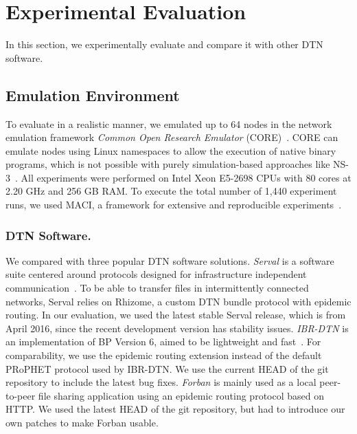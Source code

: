 \section{Experimental Evaluation}
\label{sec:evaluation}

In this section, we experimentally evaluate \dtn and compare it with other DTN software.

\subsection{Emulation Environment}
To evaluate \dtn in a realistic manner, we emulated up to 64 nodes in the network emulation framework \emph{Common Open Research Emulator} (CORE)~\cite{ahrenholz2010comparison}.
CORE can emulate nodes using Linux namespaces to allow the execution of native binary programs, which is not possible with purely simulation-based approaches like NS-3~\cite{riley2010ns,schwerdel2011tomato}.
All experiments were performed on Intel Xeon E5-2698 CPUs with 80 cores at 2.20 GHz and 256 GB RAM.
To execute the total number of 1,440 experiment runs, we used MACI, a framework for extensive and reproducible experiments~\cite{froemmgen2018maci}.

\subsubsection{DTN Software.}
We compared \dtn with three popular DTN software solutions.
\textit{Serval} is a software suite centered around protocols designed for infra\-structure independent communication~\cite{gardner2011serval}.
To be able to transfer files in intermittently connected networks, Serval relies on Rhizome, a custom DTN bundle protocol with epidemic routing.
In our evaluation, we used the latest stable Serval release, which is from April 2016, since the recent development version has stability issues.
\textit{IBR-DTN} is an implementation of BP Version 6, aimed to be lightweight and fast~\cite{doering2008ibr}.
For comparability, we use the epidemic routing extension instead of the default PRoPHET protocol used by IBR-DTN.
We use the current HEAD of the git repository to include the latest bug fixes.
\textit{Forban} is mainly used as a local peer-to-peer file sharing application using an epidemic routing protocol based on HTTP.
We used the latest HEAD of the git repository, but had to introduce our own patches to make Forban usable.

